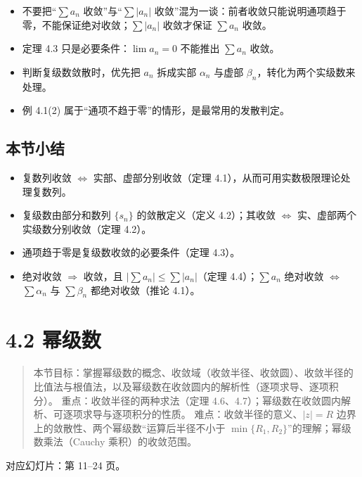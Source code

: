 \begin{itemize}
\tightlist
\item
  不要把``\(\sum a_n\) 收敛''与``\(\sum|a_n|\)
  收敛''混为一谈：前者收敛只能说明通项趋于零，不能保证绝对收敛；\(\sum|a_n|\)
  收敛才保证 \(\sum a_n\) 收敛。
\item
  定理 4.3 只是必要条件：\(\lim a_n=0\) 不能推出 \(\sum a_n\) 收敛。
\item
  判断复级数敛散时，优先把 \(a_n\) 拆成实部 \(\alpha_n\) 与虚部
  \(\beta_n\)，转化为两个实级数来处理。
\item
  例 4.1(2) 属于``通项不趋于零''的情形，是最常用的发散判定。
\end{itemize}

\subsection{本节小结}\label{ux672cux8282ux5c0fux7ed3-11}

\begin{itemize}
\tightlist
\item
  复数列收敛 \(\iff\) 实部、虚部分别收敛（定理
  4.1），从而可用实数极限理论处理复数列。
\item
  复级数由部分和数列 \(\{s_n\}\) 的敛散定义（定义 4.2）；其收敛 \(\iff\)
  实、虚部两个实级数分别收敛（定理 4.2）。
\item
  通项趋于零是复级数收敛的必要条件（定理 4.3）。
\item
  绝对收敛 \(\Rightarrow\) 收敛，且 \(|\sum a_n|\le\sum|a_n|\)（定理
  4.4）；\(\sum a_n\) 绝对收敛 \(\iff\) \(\sum\alpha_n\) 与
  \(\sum\beta_n\) 都绝对收敛（推论 4.1）。
\end{itemize}

\section{4.2 幂级数}\label{ux5e42ux7ea7ux6570}

\begin{quote}
本节目标：掌握幂级数的概念、收敛域（收敛半径、收敛圆）、收敛半径的比值法与根值法，以及幂级数在收敛圆内的解析性（逐项求导、逐项积分）。
重点：收敛半径的两种求法（定理
4.6、4.7）；幂级数在收敛圆内解析、可逐项求导与逐项积分的性质。
难点：收敛半径的意义、\(|z|=R\)
边界上的敛散性、两个幂级数``运算后半径不小于
\(\min\{R_1,R_2\}\)''的理解；幂级数乘法（Cauchy 乘积）的收敛范围。
\end{quote}

对应幻灯片：第 11--24 页。


